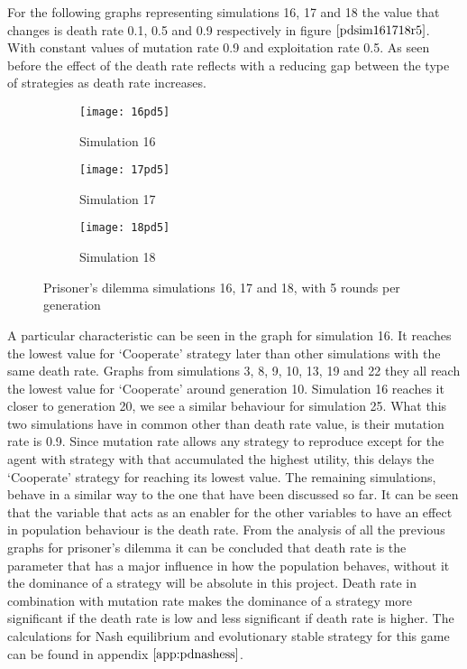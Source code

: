 For the following graphs representing simulations 16, 17 and 18 the value that changes is death rate 0.1, 0.5 and 0.9 respectively in figure $\ref{pdsim161718r5}$. With constant values of mutation rate  0.9 and exploitation rate 0.5. As seen before the effect of the death rate reflects with a reducing gap between the type of strategies as death rate increases. 
 
\begin{figure}[H]       
    \centering
    \begin{subfigure}[b]{0.3\textwidth}
	\centering
	{\texttt{[image: 16pd5]}}   
    	\caption{Simulation 16}
	\label{fig:pds16}
    \end{subfigure}
    \hfill
    \begin{subfigure}[b]{0.3\textwidth}
	\centering
	{\texttt{[image: 17pd5]}}   
    	\caption{Simulation 17}
	\label{fig:pds17}
    \end{subfigure}
    \hfill
    \begin{subfigure}[b]{0.3\textwidth}
	\centering
	{\texttt{[image: 18pd5]}}   
    	\caption{Simulation 18}
	\label{fig:pds18}
    \end{subfigure}
    \caption{Prisoner's dilemma simulations 16, 17 and 18, with 5 rounds per generation}
    \label{pdsim161718r5}
\end{figure}

A particular characteristic can be seen in the graph for simulation 16. It reaches the lowest value for `Cooperate' strategy later than other simulations with the same death rate. Graphs from simulations 3, 8, 9, 10, 13, 19 and 22 they all reach the lowest value for `Cooperate' around generation 10. Simulation 16 reaches it closer to generation 20, we see a similar behaviour for simulation 25. What this two simulations have in common other than death rate value, is their mutation rate is 0.9. Since mutation rate allows any strategy to reproduce except for the agent with strategy with that accumulated the highest utility, this delays the `Cooperate' strategy for reaching its lowest value.		  
The remaining simulations, behave in a similar way to the one that have been discussed  so far. It can be seen that the variable that acts as an enabler for the other variables to have an effect in population behaviour is the death rate. 
From the analysis of all the previous graphs for prisoner's dilemma it can be concluded that death rate is the parameter that has a major influence in how the population behaves, without it the dominance of a strategy will be absolute in this project. Death rate in combination with mutation rate makes the dominance of a strategy more significant if the death rate is low and less significant if death rate is higher.
The calculations for Nash equilibrium and evolutionary stable strategy for this game can be found in appendix $\ref{app:pdnashess}$.

